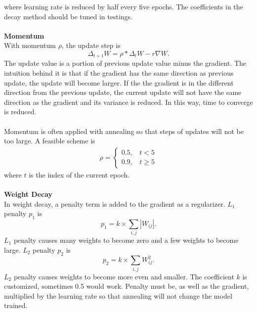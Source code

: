 \documentclass[12pt]{article}
\begin{document}
where learning rate is reduced by half every five epochs. The coefficients in the decay method should be tuned in testings.\\
\\
\textbf{Momentum}\\
With momentum $\rho$, the update step is \begin{equation}
\Delta_{t+1} W = \rho * \Delta_t W - r\nabla W.
\end{equation}
The update value is a portion of previous update value minus the gradient. The intuition behind it is that if the gradient has the same direction as previous update, the update will become larger. If the the gradient is in the different direction from the previous update, the current update will not have the same direction as the gradient and its variance is reduced. In this way, time to converge is reduced.\\
\\
Momentum is often applied with annealing so that steps of updates will not be too large. A feasible scheme is \begin{eqnarray}
\rho=\begin{cases}
0.5,~~~~t <  5\\
0.9,~~~~t \geq 5
\end{cases}
\end{eqnarray}
where $t$ is the index of the current epoch.\\
\\
\textbf{Weight Decay}\\
In weight decay, a penalty term is added to the gradient as a regularizer. $L_1$ penalty $p_1$ is \begin{equation}
p_1 = k \times \sum_{i,j} |W_{ij}|.
\end{equation}
$L_1$ penalty causes many weights to become zero and a few weights to become large. $L_2$ penalty $p_2$ is \begin{equation}
p_2 = k \times \sum_{i,j} W_{ij}^2.
\end{equation}
$L_2$ penalty causes weights to become more even and smaller. The coefficient $k$ is customized, sometimes 0.5 would work. Penalty must be, as well as the gradient, multiplied by the learning rate so that annealing will not change the model trained. 
\end{document}
